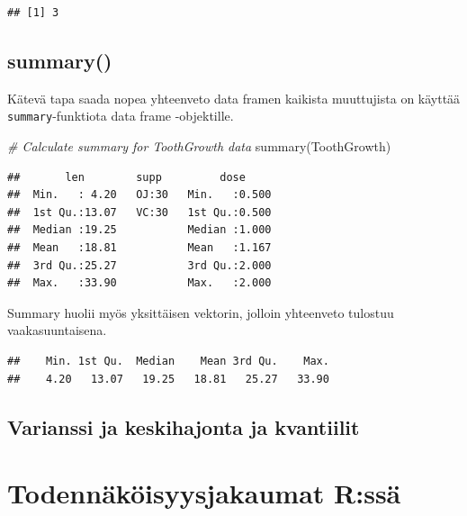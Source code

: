 \documentclass[
]{book}
\newenvironment{Shaded}{\begin{snugshade}}{\end{snugshade}}
\newcommand{\CommentTok}[1]{\textcolor[rgb]{0.56,0.35,0.01}{\textit{#1}}}
\newcommand{\FunctionTok}[1]{\textcolor[rgb]{0.00,0.00,0.00}{#1}}
\newcommand{\NormalTok}[1]{#1}
\newcommand{\OtherTok}[1]{\textcolor[rgb]{0.56,0.35,0.01}{#1}}
\newcommand{\SpecialCharTok}[1]{\textcolor[rgb]{0.00,0.00,0.00}{#1}}
\begin{document}
\begin{verbatim}
## [1] 3
\end{verbatim}

\hypertarget{summary}{%
\section{summary()}\label{summary}}

Kätevä tapa saada nopea yhteenveto data framen kaikista muuttujista on käyttää \texttt{summary}-funktiota data frame -objektille.

\begin{Shaded}
\begin{Highlighting}[]
\CommentTok{\# Calculate summary for ToothGrowth data}
\FunctionTok{summary}\NormalTok{(ToothGrowth)}
\end{Highlighting}
\end{Shaded}

\begin{verbatim}
##       len        supp         dose      
##  Min.   : 4.20   OJ:30   Min.   :0.500  
##  1st Qu.:13.07   VC:30   1st Qu.:0.500  
##  Median :19.25           Median :1.000  
##  Mean   :18.81           Mean   :1.167  
##  3rd Qu.:25.27           3rd Qu.:2.000  
##  Max.   :33.90           Max.   :2.000
\end{verbatim}

Summary huolii myös yksittäisen vektorin, jolloin yhteenveto tulostuu vaakasuuntaisena.

\begin{Shaded}
\end{Shaded}

\begin{verbatim}
##    Min. 1st Qu.  Median    Mean 3rd Qu.    Max. 
##    4.20   13.07   19.25   18.81   25.27   33.90
\end{verbatim}

\hypertarget{varianssi-ja-keskihajonta-ja-kvantiilit}{%
\section{Varianssi ja keskihajonta ja kvantiilit}\label{varianssi-ja-keskihajonta-ja-kvantiilit}}

\hypertarget{distributions}{%
\chapter{Todennäköisyysjakaumat R:ssä}\label{distributions}}
\end{document}
